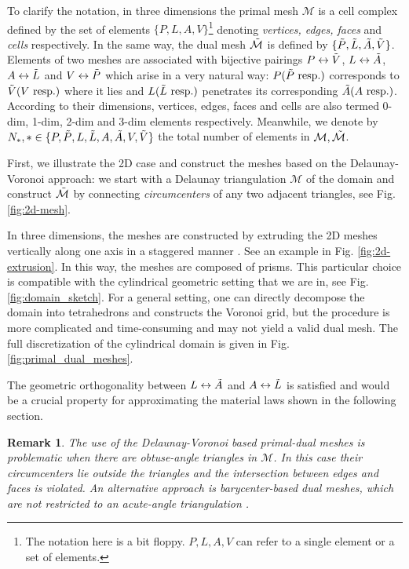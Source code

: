 \documentclass{article}
\newtheorem*{remark}{Remark}
\begin{document}
To clarify the notation, in three dimensions the primal mesh $\mathcal{M}$ is a cell complex defined by the set of elements $\{P, L, A, V\}$\footnote{The notation here is a bit floppy. $P, L, A, V$ can refer to a single element or a set of elements.} denoting \emph{vertices, edges, faces} and \emph{cells} respectively. In the same way, the dual mesh $\Tilde{\mathcal{M}}$ is defined by $\{\Tilde{P}, \Tilde{L}, \Tilde{A}, \Tilde{V}\}$. Elements of two meshes are associated with bijective pairings $P \leftrightarrow \Tilde{V}$, $L \leftrightarrow \Tilde{A}$, $A \leftrightarrow \Tilde{L}$ and $V \leftrightarrow \Tilde{P}$ which arise in a very natural way: $P(\Tilde{P} \text{ resp.})$ corresponds to $\Tilde{V}(V \text{ resp.})$ where it lies and $L(\Tilde{L} \text{ resp.})$ penetrates its corresponding $\Tilde{A}(A \text{ resp.})$. According to their dimensions, vertices, edges, faces and cells are also termed 0-dim, 1-dim, 2-dim and 3-dim elements respectively. Meanwhile, we denote by $N_\ast, \ast \in \{P, \Tilde{P}, L, \Tilde{L},A, \Tilde{A},V, \Tilde{V}\}$ the total number of elements in $\mathcal{M}, \Tilde{\mathcal{M}}$. 

First, we illustrate the 2D case and construct the meshes based on the Delaunay-Voronoi approach: we start with a Delaunay triangulation $\mathcal{M}$ of the domain and construct $\Tilde{\mathcal{M}}$ by connecting \emph{circumcenters} of any two adjacent triangles, see Fig. \ref{fig:2d-mesh}.

In three dimensions, the meshes are constructed by extruding the 2D meshes vertically along one axis in a staggered manner \cite{Marrone_2001}. See an example in Fig. \ref{fig:2d-extrusion}. In this way, the meshes are composed of prisms. This particular choice is compatible with the cylindrical geometric setting that we are in, see Fig. \ref{fig:domain_sketch}. For a general setting, one can directly decompose the domain into tetrahedrons and constructs the Voronoi grid, but the procedure is more complicated and time-consuming and may not yield a valid dual mesh. The full discretization of the cylindrical domain is given in Fig. \ref{fig:primal_dual_meshes}. 

The geometric orthogonality between $L \leftrightarrow \Tilde{A}$ and $A \leftrightarrow \Tilde{L}$ is satisfied and would be a crucial property for approximating the material laws shown in the following section. 

\begin{remark}
    The use of the Delaunay-Voronoi based primal-dual meshes is problematic when there are obtuse-angle triangles in $\mathcal{M}$. In this case their circumcenters lie outside the triangles and the intersection between edges and faces is violated. An alternative approach is barycenter-based dual meshes, which are not restricted to an acute-angle triangulation \cite{Marrone_2001}. 
\end{remark}
\end{document}
